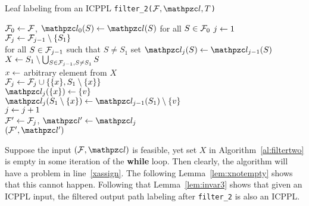 \begin{algorithm}[h]
  \caption{Leaf labeling from an ICPPL {\tt filter\_2($\cF, \cl, T$)}}
  \label{al:filtertwo} %
  \begin{algorithmic}[\lndisplay]
    \STATE ${\cal F}_0 \leftarrow {\cal F}$, $\cl_0(S) \assign \cl(S)$ for all $S
    \in {\cal F}_0$ 
    \STATE $j \leftarrow 1$\\
    \label{uniqueleaf}
    \STATE ${\cal F}_j \leftarrow {\cal F}_{j-1} \setminus \{S_1\}$\\
    \STATE for all $S \in {\cal F}_{j-1}$ such that $S \ne S_1$ set
    $\cl_j(S) \assign
    \cl_{j-1}(S)$\\
    \STATE $X \leftarrow S_1 \setminus \bigcup_{S \in {\cal F}_{j-1}, S \ne S_1}S$\\
    \STATE \label{xassign} $x \leftarrow $ arbitrary element from $X$\\
    \STATE ${\cal F}_j \leftarrow {\cal F}_j \cup \{\{x\}, S_1 \setminus \{x\}\} $\\
    \STATE $\cl_j(\{x\}) \assign \{v\}$\\
    \STATE $\cl_j(S_1 \setminus \{x\}) \assign \cl_{j-1}(S_1) \setminus \{v\}$\\
    \STATE $j \leftarrow j+1$\\
    \ENDWHILE
    \STATE ${\cal F}' \leftarrow {\cal F}_j$, $\cl' \assign \cl_j$\\
    \RETURN $(\cF', \cl')$
  \end{algorithmic}
\end{algorithm}


Suppose the input $(\cF, \cl)$ is feasible, yet set $X$ in
Algorithm~\ref{al:filtertwo} is empty in some iteration of the {\bf
  while} loop. Then clearly, the algorithm will have a problem in line~\ref{xassign}.
The following Lemma~\ref{lem:xnotempty} shows that this cannot
happen. Following that Lemma~\ref{lem:invar3} shows that given an
ICPPL input, the filtered output path labeling after {\tt filter\_2}
is also an ICPPL.

